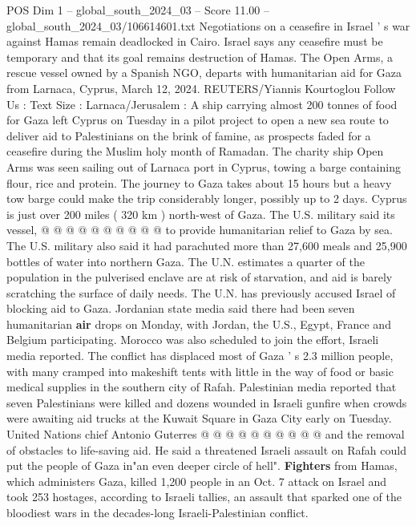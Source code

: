 \begin{textsample}{POS Dim 1 – global\_south\_2024\_03 – Score 11.00 – global\_south\_2024\_03/106614601.txt}  \label{ex:f1_pos_349}
Negotiations on a ceasefire in Israel ' s war against Hamas remain deadlocked in Cairo.
Israel says any ceasefire must be temporary and that its goal remains destruction of Hamas.
The Open Arms, a rescue vessel owned by a Spanish NGO, departs with humanitarian aid for Gaza from Larnaca, Cyprus, March 12, 2024.
REUTERS/Yiannis Kourtoglou Follow Us : Text Size : Larnaca/Jerusalem : A ship carrying almost 200 tonnes of food for Gaza left Cyprus on Tuesday in a pilot project to open a new sea route to deliver aid to Palestinians on the brink of famine, as prospects faded for a ceasefire during the Muslim holy month of Ramadan.
The charity ship Open Arms was seen sailing out of Larnaca port in Cyprus, towing a barge containing flour, rice and protein.
The journey to Gaza takes about 15 hours but a heavy tow barge could make the trip considerably longer, possibly up to 2 days.
Cyprus is just over 200 miles ( 320 km ) north-west of Gaza.
The U.S. military said its vessel, @ @ @ @ @ @ @ @ @ @ to provide humanitarian relief to Gaza by sea.
The U.S. military also said it had parachuted more than 27,600 meals and 25,900 bottles of water into northern Gaza.
The U.N. estimates a quarter of the population in the pulverised enclave are at risk of starvation, and aid is barely scratching the surface of daily needs.
The U.N. has previously accused Israel of blocking aid to Gaza.
Jordanian state media said there had been seven humanitarian \textbf{air} drops on Monday, with Jordan, the U.S., Egypt, France and Belgium participating.
Morocco was also scheduled to join the effort, Israeli media reported.
The conflict has displaced most of Gaza ' s 2.3 million people, with many cramped into makeshift tents with little in the way of food or basic medical supplies in the southern city of Rafah.
Palestinian media reported that seven Palestinians were killed and dozens wounded in Israeli gunfire when crowds were awaiting aid trucks at the Kuwait Square in Gaza City early on Tuesday.
United Nations chief Antonio Guterres @ @ @ @ @ @ @ @ @ @ and the removal of obstacles to life-saving aid.
He said a threatened Israeli assault on Rafah could put the people of Gaza in"an even deeper circle of hell". \textbf{Fighters} from Hamas, which administers Gaza, killed 1,200 people in an Oct. 7 attack on Israel and took 253 hostages, according to Israeli tallies, an assault that sparked one of the bloodiest wars in the decades-long Israeli-Palestinian conflict.

\end{textsample}
